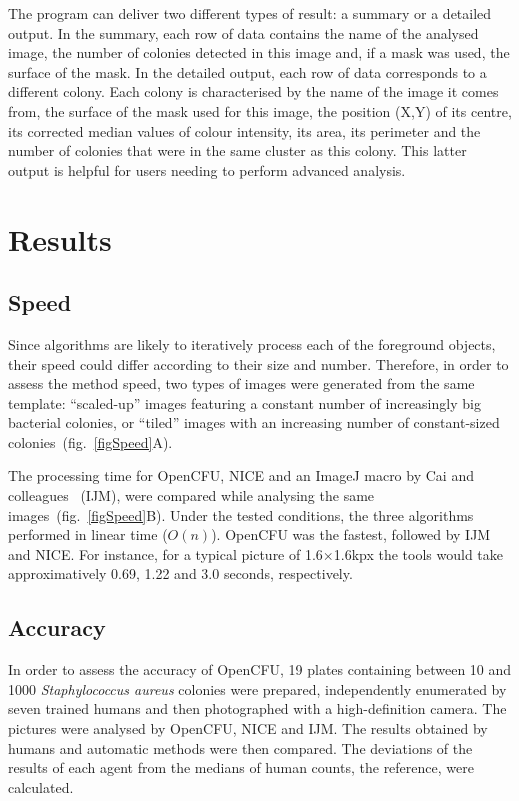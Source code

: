 \documentclass[10pt]{article}
\newcommand{\n}{seven}
\newcommand{\sa}{\emph{Staphylococcus aureus}}
\newcommand{\IJM}{IJM}
\begin{document}
The program can deliver two different types of result: a summary or a detailed 
output. In the summary, each row of data contains
the name of the analysed image, the number of 
colonies
detected in this image and, if a mask was used, the surface of the mask.
In the detailed output, each row of data corresponds to a different colony. 
Each colony is characterised by the name of the image it comes from,
the surface of the mask used for this image,
the position (X,Y) of its centre, its corrected median values of colour intensity,
its area, its perimeter and the number of colonies that were in the same cluster 
as
this colony. This latter output is helpful for users needing
to perform advanced analysis.


\section*{Results}

\subsection*{Speed}
Since algorithms are likely to iteratively process each of the foreground
objects, their speed could differ according to their size and number.
Therefore, in order to assess the method speed,  two types of images were
generated from the same template:
``scaled-up'' images featuring a constant number of increasingly big bacterial
colonies, or ``tiled'' images with an increasing number of constant-sized
colonies~(fig.~\ref{figSpeed}A).

The processing time for OpenCFU, NICE\cite{clarke_lowcost_2010} and an ImageJ macro by Cai and colleagues
\cite{cai_optimized_2011}~(\IJM{}),
were compared while analysing the same images~(fig.~\ref{figSpeed}B). Under the
tested conditions, the three algorithms performed in linear time ($O(n)$).
OpenCFU was the fastest, followed by \IJM{} and NICE.
For instance, for a typical picture of 1.6$\times{}$1.6kpx the tools would take
approximatively 0.69, 1.22 and 3.0 seconds, respectively.

\subsection*{Accuracy} 
In order to assess the accuracy of OpenCFU, 19 plates
containing between 10 and 1000 \sa{} colonies were prepared, independently
enumerated by \n{} trained humans and then photographed with a high-definition camera.
The pictures were analysed by OpenCFU, NICE and \IJM{}.
The results obtained by humans and automatic methods were then compared.
The deviations of the results of each
agent from the medians of human counts, the reference, were
calculated.
\end{document}
